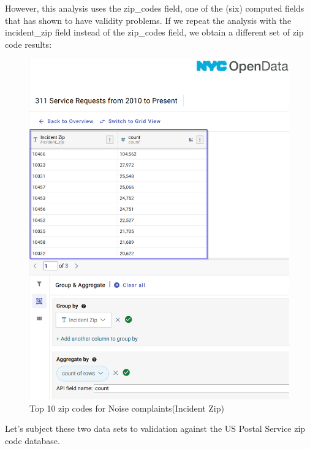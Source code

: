 \documentclass[12pt, titlepage]{article}
\begin{document}
{		However, this analysis uses the zip\_codes field, one of the (six) computed fields that has shown to have validity problems. If we repeat the analysis with the 
		incident\_zip field instead of the zip\_codes field, we obtain a different set of zip code results:
		
		\begin{figure}[H]
	    		\centering
	    		\includegraphics[scale = 0.6]{incident_zip_casestudy.png}
	    		\caption{Top 10 zip codes for Noise complaints(Incident Zip)}
	    	\label{fig:casestudy1-incident-zip}
		\end{figure}
		
	Let's subject these two data sets to validation against the US Postal Service zip code database.
	 
}
\end{document}
